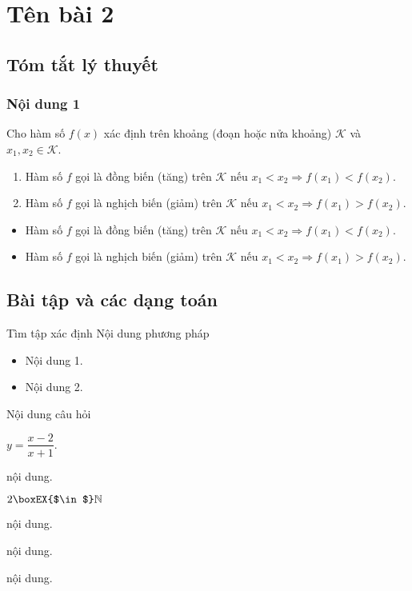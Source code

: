 \section{Tên bài 2}
\subsection{Tóm tắt lý thuyết}

\begin{tomtat}
\subsubsection{Nội dung 1}
\begin{dn}
Cho hàm số $f(x)$ xác định trên khoảng (đoạn hoặc nửa khoảng) $\mathcal{K}$ và $x_1,x_2\in \mathcal K$.
\begin{enumerate}
	\item Hàm số $f$ gọi là đồng biến (tăng) trên $\mathcal K$ nếu $x_1<x_2\Rightarrow f(x_1)<f(x_2)$.
	\item Hàm số $f$ gọi là nghịch biến (giảm) trên $\mathcal K$ nếu $x_1<x_2\Rightarrow f(x_1)>f(x_2)$.
\end{enumerate}
\end{dn}
\begin{note}
	\begin{itemize}
		\item Hàm số $f$ gọi là đồng biến (tăng) trên $\mathcal K$ nếu $x_1<x_2\Rightarrow f(x_1)<f(x_2)$.
		\item Hàm số $f$ gọi là nghịch biến (giảm) trên $\mathcal K$ nếu $x_1<x_2\Rightarrow f(x_1)>f(x_2)$.
	\end{itemize}
\end{note}
\end{tomtat}

\subsection{Bài tập và các dạng toán}

\begin{dang}{Tìm tập xác định}
	Nội dung phương pháp
	\begin{itemize}
		\item Nội dung 1.
		\item Nội dung 2.
	\end{itemize}
\end{dang}

\begin{vd}
Nội dung câu hỏi
\begin{listEX}[2]
	\item $y=\dfrac{x-2}{x+1}$. 
	\item nội dung. 
	\item $2\boxEX{$\in$}\mathbb{N}$
	\item nội dung.
	\item nội dung.
	\item nội dung.
\end{listEX}
\end{vd}

